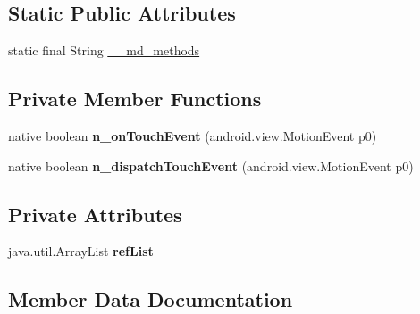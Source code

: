\subsection*{Static Public Attributes}
\begin{DoxyCompactItemize}
\item 
static final String \hyperlink{classmd5b60ffeb829f638581ab2bb9b1a7f4f3f_1_1Platform__DefaultRenderer_af4577cee8cad226436d0bce948786b98}{\+\_\+\+\_\+md\+\_\+methods}
\end{DoxyCompactItemize}
\subsection*{Private Member Functions}
\begin{DoxyCompactItemize}
\item 
\mbox{\label{classmd5b60ffeb829f638581ab2bb9b1a7f4f3f_1_1Platform__DefaultRenderer_ab0074968bde1ff3ab9249da5dcda2751}} 
native boolean {\bfseries n\+\_\+on\+Touch\+Event} (android.\+view.\+Motion\+Event p0)
\item 
\mbox{\label{classmd5b60ffeb829f638581ab2bb9b1a7f4f3f_1_1Platform__DefaultRenderer_a099fc6dfc3ae7b6ee05e01cd5ae0716c}} 
native boolean {\bfseries n\+\_\+dispatch\+Touch\+Event} (android.\+view.\+Motion\+Event p0)
\end{DoxyCompactItemize}
\subsection*{Private Attributes}
\begin{DoxyCompactItemize}
\item 
\mbox{\label{classmd5b60ffeb829f638581ab2bb9b1a7f4f3f_1_1Platform__DefaultRenderer_a6a4513e1bfb8e75fe2e407dd4749c4f8}} 
java.\+util.\+Array\+List {\bfseries ref\+List}
\end{DoxyCompactItemize}


\subsection{Member Data Documentation}
\mbox{\label{classmd5b60ffeb829f638581ab2bb9b1a7f4f3f_1_1Platform__DefaultRenderer_af4577cee8cad226436d0bce948786b98}} 
